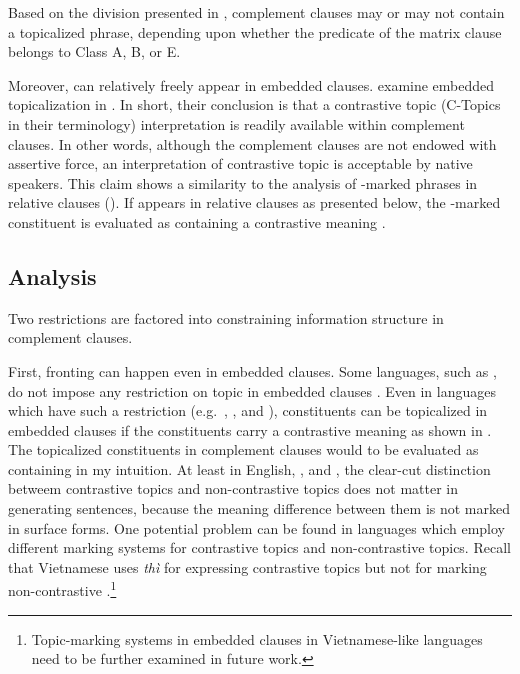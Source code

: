 \noindent Based on the division presented in
, complement clauses may or
may not contain a topicalized phrase, depending upon whether the
predicate of the matrix clause belongs to Class A, B, or E.


Moreover,  can relatively freely appear in embedded
clauses.  \citet{bianchi:frascarelli:10} examine embedded
topicalization in . In short, their
conclusion is that a contrastive topic (C-Topics in their terminology)
interpretation is readily available within complement clauses. In
other words, although the complement clauses are not endowed with
assertive force, an interpretation of contrastive topic is acceptable
by native speakers.  This claim shows a similarity to the analysis of
\nun-marked phrases in  relative clauses
(). If \nun
appears in relative clauses as presented below, the \nun-marked
constituent is evaluated as containing a contrastive meaning
\citep{lim:12}.





\subsection{Analysis}
\label{10:ssec:embedded:analysis}

Two restrictions are factored into constraining information
structure in complement clauses.

First,  fronting can happen even in embedded clauses. Some
languages, such as , do not impose any restriction on
topic  in embedded clauses \citep{roberts:11}. Even in
languages which have such a restriction (e.g.\ ,
, and ), constituents can be topicalized in
embedded clauses if the constituents carry a contrastive meaning as
shown in .  The topicalized constituents in
complement clauses would to be evaluated as containing
 in my intuition.  At least in English,
, and , the clear-cut distinction betweem
contrastive topics and non-contrastive topics does not matter in
generating sentences,
because the meaning difference between them is
not marked in surface forms.  One potential problem can be found in
languages which employ different marking systems for contrastive
topics and non-contrastive topics. Recall that Vietnamese uses
\textit{th{\`i}} for expressing contrastive topics but not for marking
non-contrastive  \citep{nguyen:06}.\footnote{Topic-marking
  systems in embedded clauses in Vietnamese-like languages need to be
  further examined in future work.}


